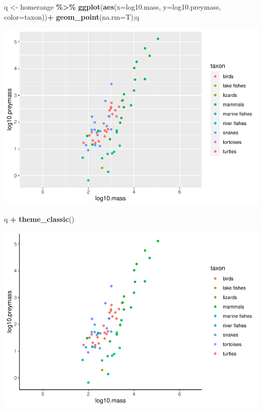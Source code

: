 \documentclass[
]{article}
\newenvironment{Shaded}{\begin{snugshade}}{\end{snugshade}}
\newcommand{\AttributeTok}[1]{\textcolor[rgb]{0.13,0.29,0.53}{#1}}
\newcommand{\FunctionTok}[1]{\textcolor[rgb]{0.13,0.29,0.53}{\textbf{#1}}}
\newcommand{\NormalTok}[1]{#1}
\newcommand{\OtherTok}[1]{\textcolor[rgb]{0.56,0.35,0.01}{#1}}
\newcommand{\SpecialCharTok}[1]{\textcolor[rgb]{0.81,0.36,0.00}{\textbf{#1}}}
\begin{document}
\begin{Shaded}
\begin{Highlighting}[]
\NormalTok{q }\OtherTok{\textless{}{-}}\NormalTok{ homerange }\SpecialCharTok{\%\textgreater{}\%} 
  \FunctionTok{ggplot}\NormalTok{(}\FunctionTok{aes}\NormalTok{(}\AttributeTok{x=}\NormalTok{log10.mass, }\AttributeTok{y=}\NormalTok{log10.preymass, }\AttributeTok{color=}\NormalTok{taxon))}\SpecialCharTok{+}
  \FunctionTok{geom\_point}\NormalTok{(}\AttributeTok{na.rm=}\NormalTok{T);q}
\end{Highlighting}
\end{Shaded}

\includegraphics{Untitled_files/figure-latex/unnamed-chunk-41-1.pdf}

\begin{Shaded}
\begin{Highlighting}[]
\NormalTok{q }\SpecialCharTok{+} \FunctionTok{theme\_classic}\NormalTok{()}
\end{Highlighting}
\end{Shaded}

\includegraphics{Untitled_files/figure-latex/unnamed-chunk-42-1.pdf}
\end{document}

